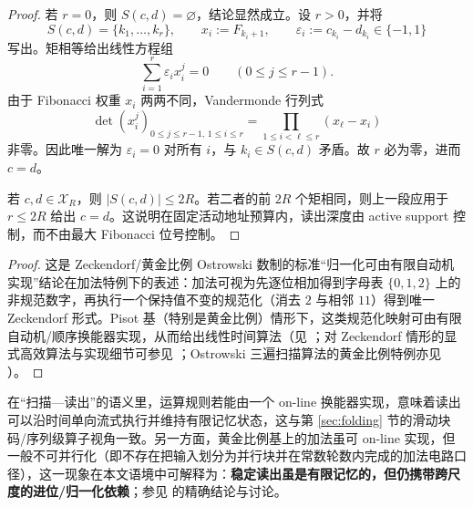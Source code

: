 \begin{proof}
若 \(r=0\)，则 \(S(c,d)=\varnothing\)，结论显然成立。设 \(r>0\)，并将
\[
S(c,d)=\{k_1,\ldots,k_r\},\qquad x_i:=F_{k_i+1},\qquad
\varepsilon_i:=c_{k_i}-d_{k_i}\in\{-1,1\}
\]
写出。矩相等给出线性方程组
\[
\sum_{i=1}^r\varepsilon_i x_i^j=0\qquad(0\le j\le r-1).
\]
由于 Fibonacci 权重 \(x_i\) 两两不同，Vandermonde 行列式
\[
\det(x_i^{j})_{0\le j\le r-1,\,1\le i\le r}
=\prod_{1\le i<\ell\le r}(x_\ell-x_i)
\]
非零。因此唯一解为 \(\varepsilon_i=0\) 对所有 \(i\)，与 \(k_i\in S(c,d)\) 矛盾。故 \(r\) 必为零，进而 \(c=d\)。

若 \(c,d\in\mathcal X_R\)，则 \(|S(c,d)|\le2R\)。若二者的前 \(2R\) 个矩相同，则上一段应用于 \(r\le2R\) 给出 \(c=d\)。这说明在固定活动地址预算内，读出深度由 active support 控制，而不由最大 Fibonacci 位号控制。
\end{proof}

\begin{proof}
这是 Zeckendorf/黄金比例 Ostrowski 数制的标准“归一化可由有限自动机实现”结论在加法特例下的表述：加法可视为先逐位相加得到字母表 $\{0,1,2\}$ 上的非规范数字，再执行一个保持值不变的规范化（消去 $2$ 与相邻 $11$）得到唯一 Zeckendorf 形式。Pisot 基（特别是黄金比例）情形下，这类规范化映射可由有限自动机/顺序换能器实现，从而给出线性时间算法（见 \cite{Frougny1992NumbersAutomata,Frougny1999OnlineAddition}；对 Zeckendorf 情形的显式高效算法与实现细节可参见 \cite{AhlbachUsatineFrougnyPippenger2013}；Ostrowski 三遍扫描算法的黄金比例特例亦见 \cite{HieronymiTerry2018OstrowskiAddition}）。
\end{proof}

\begin{remark}\label{rem:online-not-parallel}
在“扫描—读出”的语义里，运算规则若能由一个 on-line 换能器实现，意味着读出可以沿时间单向流式执行并维持有限记忆状态，这与第 \ref{sec:folding} 节的滑动块码/序列级算子视角一致。另一方面，黄金比例基上的加法虽可 on-line 实现，但一般不可并行化（即不存在把输入划分为并行块并在常数轮数内完成的加法电路口径），这一现象在本文语境中可解释为：\textbf{稳定读出虽是有限记忆的，但仍携带跨尺度的进位/归一化依赖}；参见 \cite{Frougny1999OnlineAddition} 的精确结论与讨论。
\end{remark}
